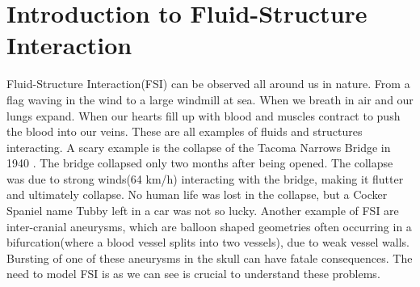 \chapter{Introduction to Fluid-Structure Interaction}
Fluid-Structure Interaction(FSI) can be observed all around us in nature. From a flag waving in the wind to a large windmill at sea. When we breath in air and our lungs expand. When our hearts fill up with blood and muscles contract to push the blood into our veins. These are all examples of fluids and structures interacting. A scary example is the collapse of the Tacoma Narrows Bridge in 1940 \cite{Billah1991}. The bridge collapsed only two months after being opened. The collapse was due to strong winds(64 km/h) interacting with the bridge, making it flutter and ultimately collapse. No human life was lost in the collapse, but a Cocker Spaniel name Tubby left in a car was not so lucky.  Another example of FSI are inter-cranial aneurysms, which are balloon shaped geometries often occurring in a bifurcation(where a blood vessel splits into two vessels), due to weak vessel walls. Bursting of one of these aneurysms in the skull can have fatale consequences. The need to model FSI is as we can see is crucial to understand these problems. \newline
